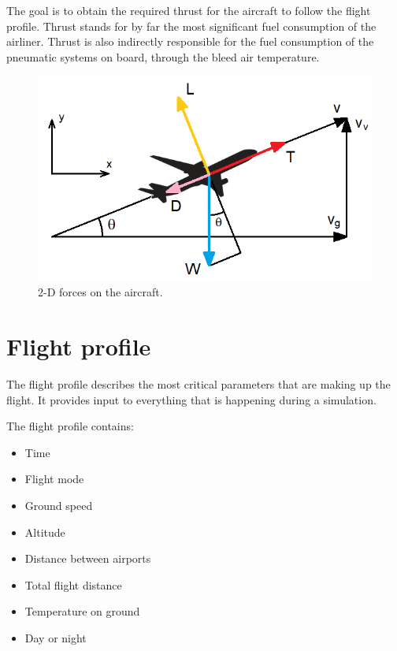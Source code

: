 \documentclass[english]{kththesis}
\begin{document}
The goal is to obtain the required thrust for the aircraft to follow the flight profile.
Thrust stands for by far the most significant fuel consumption of the airliner. Thrust is also indirectly responsible for the fuel consumption of the pneumatic systems on board, through the bleed air temperature.

\begin{figure}[!ht]
    \centering
    \includegraphics[width=1\textwidth]{Epictures/FlightDynamicsForces.png}
    \caption{2-D forces on the aircraft.}
    \label{fig:FlightForces}
\end{figure}

\section{Flight profile}
\label{sec:flightprofile}
The flight profile describes the most critical parameters that are making up the flight. It provides input to everything that is happening during a simulation.

The flight profile contains:

\begin{itemize}
  \item Time
  \item Flight mode
  \item Ground speed
  \item Altitude
  \item Distance between airports
  \item Total flight distance
  \item Temperature on ground
  \item Day or night
\end{itemize}
\end{document}
